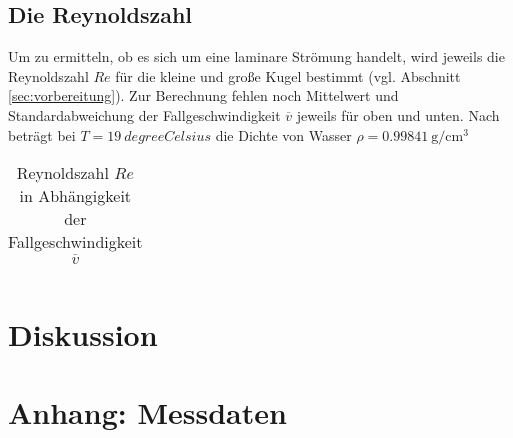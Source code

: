 \subsection[]{Die Reynoldszahl}
Um zu ermitteln, ob es sich um eine laminare Strömung handelt, wird jeweils die Reynoldszahl $Re$ für die kleine und große Kugel bestimmt
(vgl. Abschnitt \ref{sec:vorbereitung}).
Zur Berechnung fehlen noch Mittelwert und Standardabweichung der Fallgeschwindigkeit $\overline{v}$ jeweils für oben und unten.
Nach \cite[]{geschke} beträgt bei $T = \qty{19}{degreeCelsius}$ die Dichte von Wasser $\rho = \qty{0.99841}{\g \per \cm^3}$ 

\begin{table}
    \caption[]{Reynoldszahl $Re$ in Abhängigkeit der Fallgeschwindigkeit $\overline{v}$}
    \label{tab:reynold}
    \centering
    \begin{tabular}[]{S[table-format=]}
        
    \end{tabular}
\end{table}


\section{Diskussion}

\section*{Anhang: Messdaten}

\printbibliography

